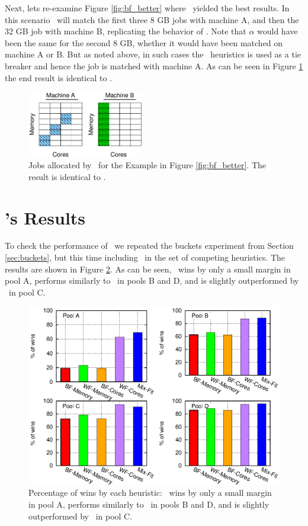 Next, lets re-examine Figure \ref{fig:bf_better} where \bef\ yielded the
best results.
In this scenario \mif\ will match the first three 8 GB jobs with
machine A, and then the 32 GB job with machine B, replicating the
behavior of \bef.
Note that $\alpha$ would have been the same for the second 8 GB,
whether it would have been matched on machine A or B.
But as noted above, in such cases the \fif\ heuristics is used as a
tie breaker and hence the job is matched with machine A.
As can be seen in Figure \ref{fig:mf_final2} the end result is
identical to \bef.

\begin{figure}\centering
	\includegraphics[width=0.45\textwidth]{figures/fig2b.eps}
\caption{Jobs allocated by \mif\ for the Example in Figure
  \ref{fig:bf_better}.
  The result is identical to \bef.}
\label{fig:mf_final2}
\end{figure}


\section{\mif's Results}

To check the performance of \mif\ we repeated the buckets 
experiment from Section \ref{sec:buckets}, 
but this time including \mif\ in the set of competing heuristics.
The results are shown in Figure \ref{fig:buckets-all}.
As can be seen, \mif\ wins by only a small margin in pool A, 
performs similarly to \wfc\ in pools B and D, and is slightly outperformed by \wfc\ 
in pool C.

\begin{figure}\centering
	\includegraphics[width=.9\textwidth]{figures/buckets-all.eps}
\caption{Percentage of wins by each heuristic: \mif\ wins by only a
  small margin in pool A, performs similarly to \wfc\ in pools B and
  D, and is slightly outperformed by \wfc\ in pool C.}
\label{fig:buckets-all}
\end{figure}

